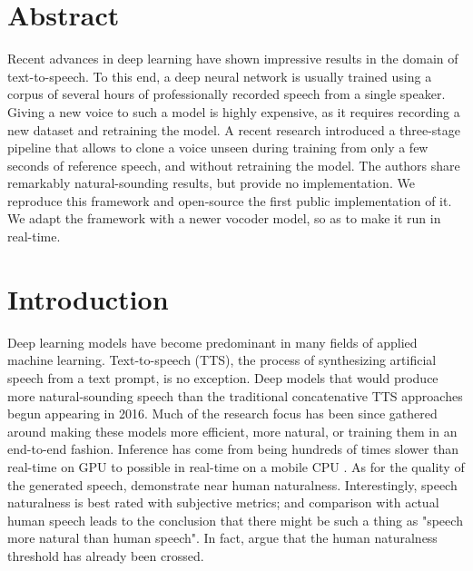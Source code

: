 \documentclass[a4paper, oneside, 12pt, english]{article}
\begin{document}
\section*{Abstract}
Recent advances in deep learning have shown impressive results in the domain of text-to-speech. To this end, a deep neural network is usually trained using a corpus of several hours of professionally recorded speech from a single speaker. Giving a new voice to such a model is highly expensive, as it requires recording a new dataset and retraining the model. A recent research introduced a three-stage pipeline that allows to clone a voice unseen during training from only a few seconds of reference speech, and without retraining the model. The authors share remarkably natural-sounding results, but provide no implementation. We reproduce this framework and open-source the first public implementation of it. We adapt the framework with a newer vocoder model, so as to make it run in real-time.
\clearpage

\tableofcontents
\clearpage

\section{Introduction}
Deep learning models have become predominant in many fields of applied machine learning. Text-to-speech (TTS), the process of synthesizing artificial speech from a text prompt, is no exception. Deep models that would produce more natural-sounding speech than the traditional concatenative TTS approaches begun appearing in 2016. Much of the research focus has been since gathered around making these models more efficient, more natural, or training them in an end-to-end fashion. Inference has come from being hundreds of times slower than real-time on GPU \citep{WaveNet} to possible in real-time on a mobile CPU \citep{EfficientNeuralAudioSynthesis}. As for the quality of the generated speech, \citet{Tacotron2} demonstrate near human naturalness. Interestingly, speech naturalness is best rated with subjective metrics; and comparison with actual human speech leads to the conclusion that there might be such a thing as "speech more natural than human speech". In fact, \citet{MOSNaturalness} argue that the human naturalness threshold has already been crossed.
\end{document}
